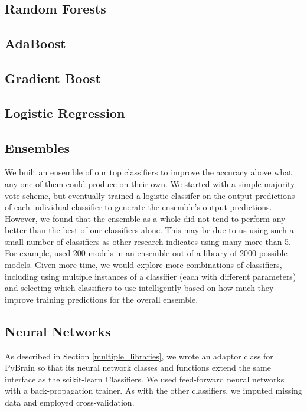 \documentclass{article}
\begin{document}
\subsection{Random Forests}

\subsection{AdaBoost}

\subsection{Gradient Boost}

\subsection{Logistic Regression}

\subsection{Ensembles}

We built an ensemble of our top classifiers to improve the accuracy above what any one of them could produce on their own.
We started with a simple majority-vote scheme, but eventually trained a logistic classifer on the output predictions of each individual classifier to generate the ensemble's output predictions.
However, we found that the ensemble as a whole did not tend to perform any better than the best of our classifiers alone.
This may be due to us using such a small number of classifiers as other research indicates using many more than 5.
For example, \cite{caruana2004ensemble} used 200 models in an ensemble out of a library of 2000 possible models.
Given more time, we would explore more combinations of classifiers, including using multiple instances of a classifier (each with different parameters) and selecting which classifiers to use intelligently based on how much they improve training predictions for the overall ensemble.

\subsection{Neural Networks}

As described in Section \ref{multiple_libraries}, we wrote an adaptor class for PyBrain so that its neural network classes and functions extend the same interface as the scikit-learn Classifiers.
We used feed-forward neural networks with a back-propagation trainer.
As with the other classifiers, we imputed missing data and employed cross-validation.
\end{document}
